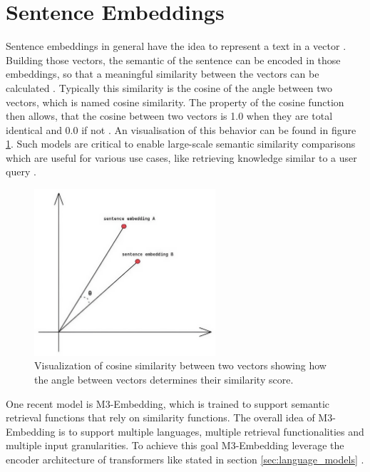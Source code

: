 \documentclass[a4paper,oneside,bibliography=totoc]{scrbook}
\begin{document}
\section{Sentence Embeddings}
\label{sec:sentence_embeddings}

Sentence embeddings in general have the idea to represent a text in a vector \cite{Singhal2001}. Building those vectors, the semantic of the sentence can be encoded in those embeddings, so that a meaningful similarity between the vectors can be calculated \cite{Reimers2019}. Typically this similarity is the cosine of the angle between two vectors, which is named cosine similarity. The property of the cosine function then allows, that the cosine between two vectors is 1.0 when they are total identical and 0.0 if not \cite{Singhal2001}. An visualisation of this behavior can be found in figure \ref{fig:cosine_similarity}. Such models are critical to enable large-scale semantic similarity comparisons which are useful for various use cases, like retrieving knowledge similar to a user query \cite{Reimers2019,Gao2024}.

\begin{figure}[t]
  \centering
  \includegraphics[width=0.6\textwidth]{figures/cosine_similarity.jpeg}
  \caption{Visualization of cosine similarity between two vectors showing how the angle between vectors determines their similarity score. \cite{Leys2022}}
  \label{fig:cosine_similarity}
\end{figure}

One recent model is M3-Embedding, which is trained to support semantic retrieval functions that rely on similarity functions. The overall idea of M3-Embedding is to support multiple languages, multiple retrieval functionalities and multiple input granularities. To achieve this goal M3-Embedding leverage the encoder architecture of transformers like stated in section \ref{sec:language_models} \cite{Chen2024}.
\end{document}
